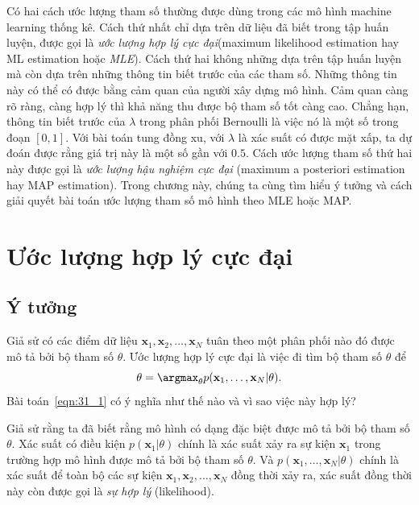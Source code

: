
Có hai cách ước lượng tham số thường được dùng trong các mô hình machine
learning thống kê. Cách thứ nhất chỉ dựa trên dữ liệu đã biết trong tập huấn
luyện, được gọi là \textit{ước lượng hợp lý cực đại}({maximum likelihood
estimation} hay {ML estimation} hoặc \textit{MLE}). Cách thứ hai không
những dựa trên tập huấn luyện mà còn dựa trên những thông tin biết trước của các
tham số. Những thông tin này có thể có được bằng {cảm quan} của người xây dựng
mô hình. {Cảm quan} càng rõ ràng, càng hợp lý thì khả năng thu được bộ tham số
tốt càng cao. Chẳng hạn, thông tin biết trước của $\lambda$ trong phân phối
Bernoulli là việc nó là một số trong đoạn $[0, 1]$. Với bài toán tung đồng xu,
với $\lambda$ là xác suất có được mặt xấp, ta dự đoán được rằng giá trị này là
một số gần với $0.5$. Cách ước lượng tham số thứ hai này được gọi là \textit{ước
lượng hậu nghiệm cực đại} ({maximum a posteriori estimation} hay
{MAP estimation}). Trong chương này, chúng ta cùng tìm hiểu ý tưởng và
cách giải quyết bài toán ước lượng tham số mô hình theo {MLE} hoặc {MAP}.
 
 
\section{Ước lượng hợp lý cực đại}
\subsection{Ý tưởng}
Giả sử có các điểm dữ liệu $\mathbf{x}_1, \mathbf{x}_2, \dots, \mathbf{x}_N$ tuân theo một phân phối nào đó được mô tả bởi bộ tham số $\theta$. 
 Ước lượng hợp lý cực đại là việc đi tìm bộ tham số $\theta$ để
\begin{equation} 
\label{eqn:31_1}
\theta = \argmax_{\theta} p(\mathbf{x}_1, \dots, \mathbf{x}_N | \theta).
\end{equation} 
Bài toán~\eqref{eqn:31_1} có ý nghĩa như thế nào và vì sao việc này hợp lý? 

Giả sử rằng ta đã biết rằng mô hình có dạng đặc biệt được mô tả bởi bộ tham số
$\theta$. Xác suất có điều kiện $p(\mathbf{x}_1 | \theta)$ chính là xác suất xảy
ra {sự kiện} $\mathbf{x}_1$ trong trường hợp mô hình được mô tả bởi bộ tham số
$\theta$. Và $p(\mathbf{x}_1, \dots, \mathbf{x}_N | \theta)$ chính là xác suất
để toàn bộ các {sự kiện} $\mathbf{x}_1, \mathbf{x}_2, \dots, \mathbf{x}_N$ đồng
thời xảy ra, xác suất đồng thời này còn được gọi là \textit{sự hợp lý} ({likelihood}).

